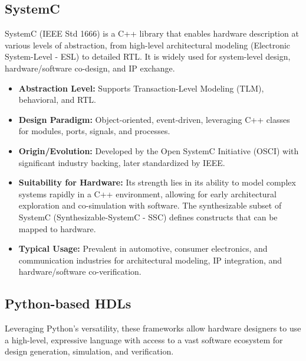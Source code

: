 \documentclass[sigconf, anonymous=false]{acmart} %
\begin{document}
\subsection{SystemC}
SystemC (IEEE Std 1666) is a C++ library that enables hardware description at various levels of abstraction, from high-level architectural modeling (Electronic System-Level - ESL) to detailed RTL. It is widely used for system-level design, hardware/software co-design, and IP exchange.
\begin{itemize}
    \item \textbf{Abstraction Level:} Supports Transaction-Level Modeling (TLM), behavioral, and RTL.
    \item \textbf{Design Paradigm:} Object-oriented, event-driven, leveraging C++ classes for modules, ports, signals, and processes.
    \item \textbf{Origin/Evolution:} Developed by the Open SystemC Initiative (OSCI) with significant industry backing, later standardized by IEEE.
    \item \textbf{Suitability for Hardware:} Its strength lies in its ability to model complex systems rapidly in a C++ environment, allowing for early architectural exploration and co-simulation with software. The synthesizable subset of SystemC (Synthesizable-SystemC - SSC) defines constructs that can be mapped to hardware.
    \item \textbf{Typical Usage:} Prevalent in automotive, consumer electronics, and communication industries for architectural modeling, IP integration, and hardware/software co-verification.
\end{itemize}

\subsection{Python-based HDLs}
Leveraging Python's versatility, these frameworks allow hardware designers to use a high-level, expressive language with access to a vast software ecosystem for design generation, simulation, and verification.
\end{document}
